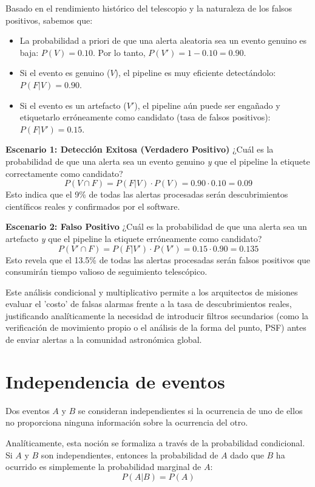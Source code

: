 Basado en el rendimiento histórico del telescopio y la naturaleza de los falsos positivos, sabemos que:
\begin{itemize}
    \item La probabilidad a priori de que una alerta aleatoria sea un evento genuino es baja: $P(V) = 0.10$. Por lo tanto, $P(V') = 1 - 0.10 = 0.90$.
    \item Si el evento es genuino ($V$), el pipeline es muy eficiente detectándolo: $P(F|V) = 0.90$.
    \item Si el evento es un artefacto ($V'$), el pipeline aún puede ser engañado y etiquetarlo erróneamente como candidato (tasa de falsos positivos): $P(F|V') = 0.15$.
\end{itemize}

\textbf{Escenario 1: Detección Exitosa (Verdadero Positivo)}
¿Cuál es la probabilidad de que una alerta sea un evento genuino \textit{y} que el pipeline la etiquete correctamente como candidato?
$$ P(V \cap F) = P(F|V) \cdot P(V) = 0.90 \cdot 0.10 = 0.09 $$
Esto indica que el 9\% de todas las alertas procesadas serán descubrimientos científicos reales y confirmados por el software.

\textbf{Escenario 2: Falso Positivo}
¿Cuál es la probabilidad de que una alerta sea un artefacto \textit{y} que el pipeline la etiquete erróneamente como candidato?
$$ P(V' \cap F) = P(F|V') \cdot P(V') = 0.15 \cdot 0.90 = 0.135 $$
Esto revela que el 13.5\% de todas las alertas procesadas serán falsos positivos que consumirán tiempo valioso de seguimiento telescópico.

Este análisis condicional y multiplicativo permite a los arquitectos de misiones evaluar el 'costo' de falsas alarmas frente a la tasa de descubrimientos reales, justificando analíticamente la necesidad de introducir filtros secundarios (como la verificación de movimiento propio o el análisis de la forma del punto, PSF) antes de enviar alertas a la comunidad astronómica global.

\section{Independencia de eventos}

Dos eventos $A$ y $B$ se consideran independientes si la ocurrencia de uno de ellos no proporciona ninguna información sobre la ocurrencia del otro. 

Analíticamente, esta noción se formaliza a través de la probabilidad condicional. Si $A$ y $B$ son independientes, entonces la probabilidad de $A$ dado que $B$ ha ocurrido es simplemente la probabilidad marginal de $A$:
$$ P(A|B) = P(A) $$

